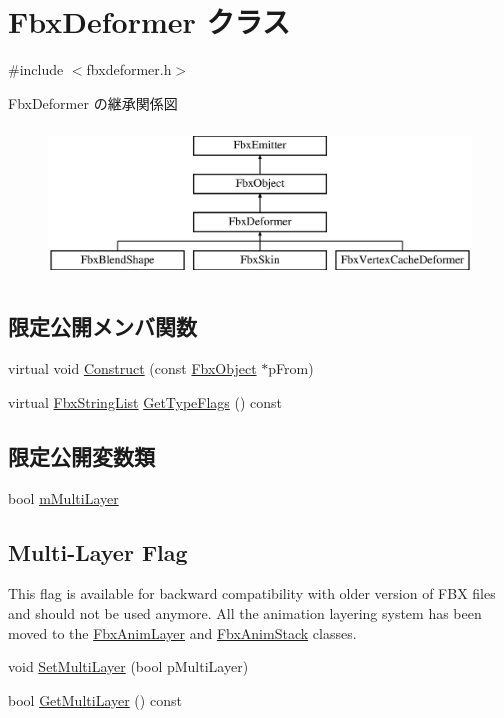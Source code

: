 \hypertarget{class_fbx_deformer}{}\section{Fbx\+Deformer クラス}
\label{class_fbx_deformer}


{\ttfamily \#include $<$fbxdeformer.\+h$>$}

Fbx\+Deformer の継承関係図\begin{figure}[H]
\begin{center}
\leavevmode
\includegraphics[height=4.000000cm]{class_fbx_deformer}
\end{center}
\end{figure}
\subsection*{限定公開メンバ関数}
\begin{DoxyCompactItemize}
\item 
virtual void \hyperlink{class_fbx_deformer_ac50e8e0e8cfd2934f8f8cca2d69a6f58}{Construct} (const \hyperlink{class_fbx_object}{Fbx\+Object} $\ast$p\+From)
\item 
virtual \hyperlink{class_fbx_string_list}{Fbx\+String\+List} \hyperlink{class_fbx_deformer_ac3f5a3eb2dda62397fc667004d798319}{Get\+Type\+Flags} () const
\end{DoxyCompactItemize}
\subsection*{限定公開変数類}
\begin{DoxyCompactItemize}
\item 
bool \hyperlink{class_fbx_deformer_ac570aba2e0282a6075831422a05c2d48}{m\+Multi\+Layer}
\end{DoxyCompactItemize}
\subsection*{Multi-\/\+Layer Flag}
\label{_amgrpdf4ac1e76a017b89c2c8620c9bd4ab91}%
This flag is available for backward compatibility with older version of F\+BX files and should not be used anymore. All the animation layering system has been moved to the \hyperlink{class_fbx_anim_layer}{Fbx\+Anim\+Layer} and \hyperlink{class_fbx_anim_stack}{Fbx\+Anim\+Stack} classes. \begin{DoxyCompactItemize}
\item 
void \hyperlink{class_fbx_deformer_ac1152e69487365faa19fe23ffde19f85}{Set\+Multi\+Layer} (bool p\+Multi\+Layer)
\item 
bool \hyperlink{class_fbx_deformer_a1f56fdb78d3b615bb2b4b4d142436e8b}{Get\+Multi\+Layer} () const
\end{DoxyCompactItemize}

